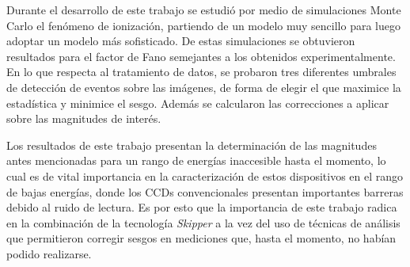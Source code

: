 Durante el desarrollo de este trabajo se estudió por medio de simulaciones Monte Carlo el fenómeno de ionización, partiendo de un modelo muy sencillo para luego adoptar un modelo más sofisticado. De estas simulaciones se obtuvieron resultados para el factor de Fano semejantes a los obtenidos experimentalmente. En lo que respecta al tratamiento de datos, se probaron tres diferentes umbrales de detección de eventos sobre las imágenes, de forma de elegir el que maximice la estadística y minimice el sesgo. Además se calcularon las correcciones a aplicar sobre las magnitudes de interés.






Los resultados de este trabajo presentan la determinación de las magnitudes antes mencionadas para un rango de energías inaccesible hasta el momento, lo cual es de vital importancia en la caracterización de estos dispositivos en el rango de bajas energías, donde los CCDs convencionales presentan importantes barreras debido al ruido de lectura. Es por esto que la importancia de este trabajo radica en la combinación de la tecnología \textit{Skipper} a la vez del uso de técnicas de análisis que permitieron corregir sesgos en mediciones que, hasta el momento, no habían podido realizarse.



\newpage
\thispagestyle{empty} \mbox{}
\thispagestyle{empty}
